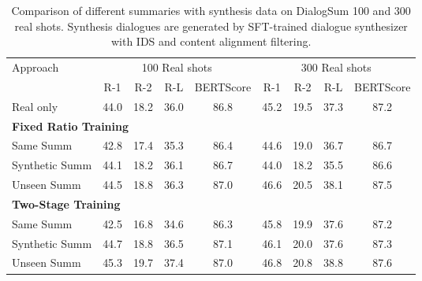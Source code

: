 \begin{table*}[ht]
\centering
\caption{Comparison of different summaries with synthesis data on DialogSum 100 and 300 real shots. Synthesis dialogues are generated by SFT-trained dialogue synthesizer with IDS and content alignment filtering.}
\label{tab:summaries}
\begin{tabular}{lcccc|cccc}
\toprule
\multirow{2}{*}{Approach} & \multicolumn{4}{c}{100 Real shots} & \multicolumn{4}{c}{300 Real shots} \\
\cmidrule(lr){2-5} \cmidrule(lr){6-9}
& R-1 & R-2 & R-L & BERTScore & R-1 & R-2 & R-L & BERTScore \\
\midrule
Real only & 44.0 & 18.2 & 36.0 & 86.8 & 45.2 & 19.5 & 37.3 & 87.2 \\
\midrule
\multicolumn{5}{l}{\textbf{Fixed Ratio Training}} \\
\midrule
Same Summ & 42.8 & 17.4 & 35.3 & 86.4 & 44.6 & 19.0 & 36.7 & 86.7 \\
Synthetic Summ & 44.1 & 18.2 & 36.1 & 86.7 & 44.0 & 18.2 & 35.5 &  86.6 \\
Unseen Summ & 44.5 & 18.8 & 36.3 & 87.0 & 46.6 & {20.5} & 38.1 & {87.5} \\
\midrule
\multicolumn{5}{l}{\textbf{Two-Stage Training}} \\
\midrule
Same Summ & 42.5 & 16.8 & 34.6 & 86.3 & 45.8 & 19.9 & 37.6 & 87.2 \\
Synthetic Summ & 44.7 & 18.8 & 36.5 & 87.1 & {46.1} & {20.0} & {37.6} & {87.3}   \\
Unseen Summ &  45.3 & 19.7 & 37.4 & 87.0 &  {46.8} & {20.8} & {38.8}  & {87.6}  \\
\bottomrule
\end{tabular}
\end{table*}


